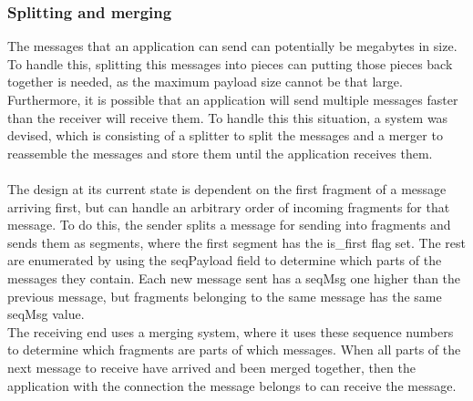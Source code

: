 \subsubsection{Splitting and merging}
The messages that an application can send can potentially be megabytes in size. To handle this, splitting this messages into pieces can putting those pieces back together is needed, as the maximum payload size cannot be that large. Furthermore, it is possible that an application will send multiple messages faster than the receiver will receive them. To handle this this situation, a system was devised, which is consisting of a splitter to split the messages and a merger to reassemble the messages and store them until the application receives them.\\
\\
The design at its current state is dependent on the first fragment of a message arriving first, but can handle an arbitrary order of incoming fragments for that message. To do this, the sender splits a message for sending into fragments and sends them as segments, where the first segment has the is\_first flag set. The rest are enumerated by using the seqPayload field to determine which parts of the messages they contain. Each new message sent has a seqMsg one higher than the previous message, but fragments belonging to the same message has the same seqMsg value.\\
The receiving end uses a merging system, where it uses these sequence numbers to determine which fragments are parts of which messages. When all parts of the next message to receive have arrived and been merged together, then the application with the connection the message belongs to can receive the message.

